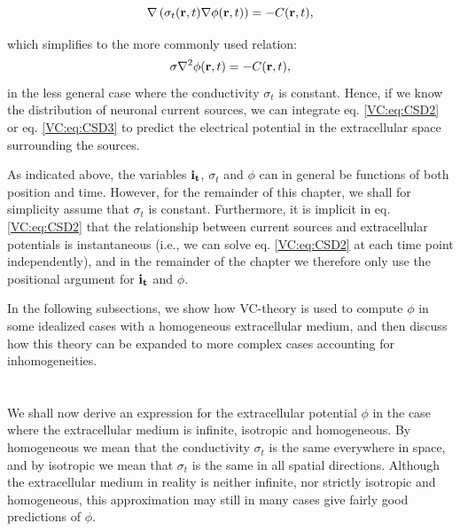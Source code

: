 \begin{equation}
\nabla \left( \sigma_t({\bf r}, t) \nabla \phi({\bf r}, t) \right) = - C({\bf r}, t),
\label{VC:eq:CSD2}
\end{equation}

which simplifies to the more commonly used relation:
\begin{equation}
\sigma \nabla^2\phi({\bf r}, t) = - C({\bf r}, t),
\label{VC:eq:CSD3}
\end{equation}
in the less general case where the conductivity $\sigma_t$ is constant. Hence, if we know the distribution of neuronal current sources, we can integrate eq. \ref{VC:eq:CSD2} or eq. \ref{VC:eq:CSD3} to predict the electrical potential in the extracellular space surrounding the sources.

As indicated above, the variables ${\bf i_t}$, $\sigma_t$ and $\phi$ can in general be functions of both position and time. However, for the remainder of this chapter, we shall for simplicity assume that $\sigma_t$ is constant. Furthermore, it is implicit in eq. \ref{VC:eq:CSD2} that the relationship between current sources and extracellular potentials is instantaneous (i.e., we can solve eq.  \ref{VC:eq:CSD2} at each time point independently), and in the remainder of the chapter we therefore only use the positional argument for ${\bf i_t}$ and $\phi$.

In the following subsections, we show how VC-theory is used to compute $\phi$ in some idealized cases with a homogeneous extracellular medium, and then discuss how this theory can be expanded to more complex cases accounting for inhomogeneities.


\section{}
\label{sec:VC:isohomo}

We shall now derive an expression for the extracellular potential $\phi$ in the case where the extracellular medium is infinite, isotropic and homogeneous. By homogeneous we mean that the conductivity $\sigma_t$ is the same everywhere in space, and by isotropic we mean that $\sigma_t$ is the same in all spatial directions. Although the extracellular medium in reality is neither infinite, nor strictly isotropic and homogeneous, this approximation may still in many cases give fairly good predictions of $\phi$.



